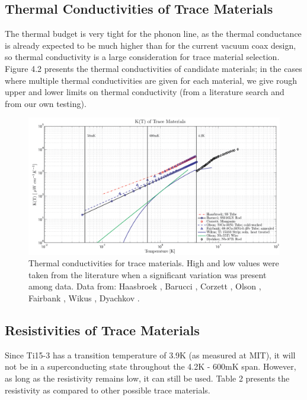 \documentclass{report}
\begin{document}
\subsection{Thermal Conductivities of Trace Materials}

The thermal budget is very tight for the phonon line, as the thermal conductance is already expected to be much higher than for the current vacuum coax design, so thermal conductivity is a large consideration for trace material selection. Figure 4.2 presents the thermal conductivities of candidate materials; in the cases where multiple thermal conductivities are given for each material, we give rough upper and lower limits on thermal conductivity (from a literature search and from our own testing).

\begin{figure}[h]
\centering
\includegraphics[width = .8\textwidth]{Trace_material_k.png}
\caption{Thermal conductivities for trace materials. High and low values were taken from the literature when a significant variation was present among data. Data from: Haasbroek \cite{has}, Barucci \cite{Barucci2008}, Corzett \cite{cor}, Olson \cite{ols}, Fairbank \cite{fair}, Wikus \cite{wik}, Dyachkov \cite{dya}.}
\end{figure}


\subsection{Resistivities of Trace Materials}
Since Ti15-3 has a transition temperature of 3.9K (as measured at MIT), it will not be in a superconducting state throughout the 4.2K - 600mK span. However, as long as the resistivity remains low, it can still be used. Table 2 presents the resistivity as compared to other possible trace materials.
\end{document}
